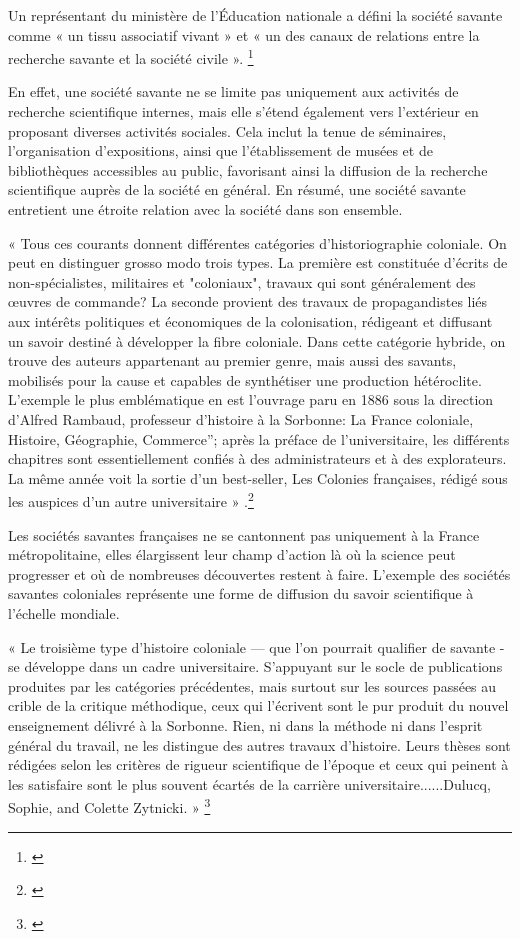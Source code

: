 Un représentant du ministère de l’Éducation nationale a défini la société savante comme « un tissu associatif vivant » et « un des canaux de relations entre la recherche savante et la société civile ». \footnote{\cite{bbu}}

En effet, une société savante ne se limite pas uniquement aux activités de recherche scientifique internes, mais elle s'étend également vers l'extérieur en proposant diverses activités sociales. Cela inclut la tenue de séminaires, l'organisation d'expositions, ainsi que l'établissement de musées et de bibliothèques accessibles au public, favorisant ainsi la diffusion de la recherche scientifique auprès de la société en général. En résumé, une société savante entretient une étroite relation avec la société dans son ensemble.

« Tous ces courants donnent différentes catégories d’historiographie coloniale. On peut en distinguer grosso modo trois types. La première est constituée d’écrits de non-spécialistes, militaires et "coloniaux", travaux qui sont généralement des œuvres de commande? La seconde provient des travaux de propagandistes liés aux intérêts politiques et économiques de la colonisation, rédigeant et diffusant un savoir destiné à développer la fibre coloniale. Dans cette catégorie hybride, on trouve des auteurs appartenant au premier genre, mais aussi des savants, mobilisés pour la cause et capables de synthétiser une production hétéroclite. L'exemple le plus emblématique en est l'ouvrage paru en 1886 sous la direction d'Alfred Rambaud, professeur d’histoire à la Sorbonne: La France coloniale, Histoire, Géographie, Commerce”; après la préface de l'universitaire, les différents chapitres sont essentiellement confiés à des administrateurs et à des explorateurs. La même année voit la sortie d’un best-seller, Les Colonies françaises, rédigé sous les auspices d’un autre universitaire » .\footnote{\cites{marge05}}

Les sociétés savantes françaises ne se cantonnent pas uniquement à la France métropolitaine, elles élargissent leur champ d'action là où la science peut progresser et où de nombreuses découvertes restent à faire. L'exemple des sociétés savantes coloniales représente une forme de diffusion du savoir scientifique à l'échelle mondiale.

« Le troisième type d'histoire coloniale — que l’on pourrait qualifier de savante - se développe dans un cadre universitaire. S’appuyant sur le socle de publications produites par les catégories précédentes, mais surtout sur les sources passées au crible de la critique méthodique, ceux qui l’écrivent sont le pur produit du nouvel enseignement délivré à la Sorbonne. Rien, ni dans la méthode ni dans l’esprit général du travail, ne les distingue des autres travaux d'histoire. Leurs thèses sont rédigées selon les critères de rigueur scientifique de l’époque et ceux qui peinent à les satisfaire sont le plus souvent écartés de la carrière universitaire......Dulucq, Sophie, and Colette Zytnicki. » \footnote{\cites{marge05}}

